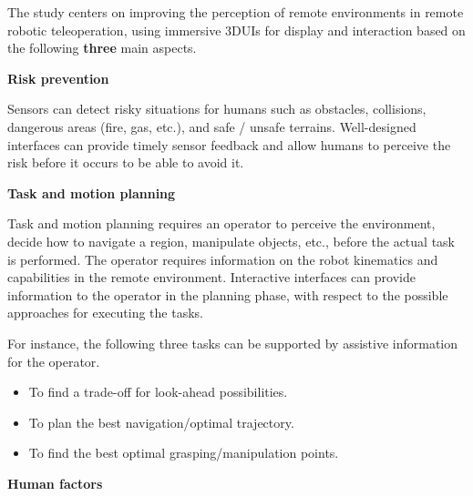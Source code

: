 The study centers on improving the perception of remote environments in remote robotic teleoperation, using immersive 3DUIs for display and interaction based on the following \textbf{three} main aspects.

\textbf{Risk prevention}

Sensors can detect risky situations for humans such as obstacles, collisions, dangerous areas (fire, gas, etc.), and safe / unsafe terrains. Well-designed interfaces can provide timely sensor feedback and allow humans to perceive the risk before it occurs to be able to avoid it.


\textbf{Task and motion planning}

Task and motion planning requires an operator to perceive the environment, decide how to navigate a region, manipulate objects, etc., before the actual task is performed. The operator requires information on the robot kinematics and capabilities in the remote environment. Interactive interfaces can provide information to the operator in the planning phase, with respect to the possible approaches for executing the tasks.

For instance, the following three tasks can be supported by assistive information for the operator.
\begin{itemize}
    \item To find a trade-off for look-ahead possibilities.
    \item To plan the best navigation/optimal trajectory.
    \item To find the best optimal grasping/manipulation points.
\end{itemize}

\textbf{Human factors}

